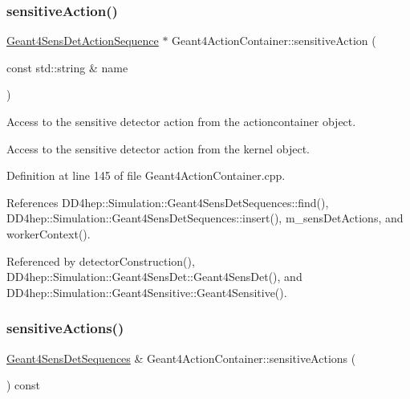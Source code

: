 \subsubsection{\texorpdfstring{sensitive\+Action()}{sensitiveAction()}}
{\footnotesize\ttfamily \hyperlink{class_d_d4hep_1_1_simulation_1_1_geant4_sens_det_action_sequence}{Geant4\+Sens\+Det\+Action\+Sequence} $\ast$ Geant4\+Action\+Container\+::sensitive\+Action (\begin{DoxyParamCaption}\item[{const std\+::string \&}]{name }\end{DoxyParamCaption})}



Access to the sensitive detector action from the actioncontainer object. 

Access to the sensitive detector action from the kernel object. 

Definition at line 145 of file Geant4\+Action\+Container.\+cpp.



References D\+D4hep\+::\+Simulation\+::\+Geant4\+Sens\+Det\+Sequences\+::find(), D\+D4hep\+::\+Simulation\+::\+Geant4\+Sens\+Det\+Sequences\+::insert(), m\+\_\+sens\+Det\+Actions, and worker\+Context().



Referenced by detector\+Construction(), D\+D4hep\+::\+Simulation\+::\+Geant4\+Sens\+Det\+::\+Geant4\+Sens\+Det(), and D\+D4hep\+::\+Simulation\+::\+Geant4\+Sensitive\+::\+Geant4\+Sensitive().

\hypertarget{class_d_d4hep_1_1_simulation_1_1_geant4_action_container_a2a0275a74e40d74fe67334fd100dd3a1}{}\label{class_d_d4hep_1_1_simulation_1_1_geant4_action_container_a2a0275a74e40d74fe67334fd100dd3a1} 
\subsubsection{\texorpdfstring{sensitive\+Actions()}{sensitiveActions()}}
{\footnotesize\ttfamily \hyperlink{class_d_d4hep_1_1_simulation_1_1_geant4_sens_det_sequences}{Geant4\+Sens\+Det\+Sequences} \& Geant4\+Action\+Container\+::sensitive\+Actions (\begin{DoxyParamCaption}{ }\end{DoxyParamCaption}) const}



